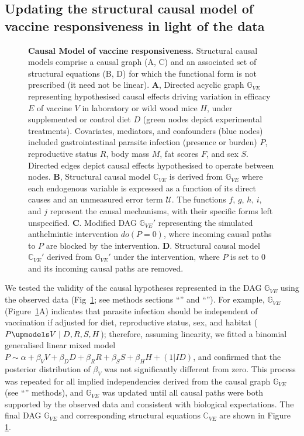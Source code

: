 \documentclass[a4paper, hidelinks, 11pt]{article}
\begin{document}
\subsection{Updating the structural causal model of vaccine responsiveness in light of the data}

\begin{figure}[htbp]
	\centering
	
	\caption{\textbf{Causal Model of vaccine responsiveness.} Structural causal models comprise a causal graph (A, C) and an associated set of structural equations (B, D) for which the functional form is not prescribed (it need not be linear). \textbf{A}, Directed acyclic graph $\mathbb{G}_{VE}$ representing hypothesised causal effects driving variation in efficacy \(E\) of vaccine \(V\) in laboratory or wild wood mice \(H\), under supplemented or control diet \(D\) (green nodes depict experimental treatments). Covariates, mediators, and confounders (blue nodes) included gastrointestinal parasite infection (presence or burden) \(P\), reproductive status \(R\), body mass \(M\), fat scores \(F\), and sex \(S\). Directed edges depict causal effects hypothesised to operate between nodes. \textbf{B}, Structural causal model \(\mathbb{C}_{VE}\) is derived from $\mathbb{G}_{VE}$ where each endogenous variable is expressed as a function of its direct causes and an unmeasured error term $\mathcal{U}$. The functions $f$, $g$, $h$, $i$, and $j$ represent the causal mechanisms, with their specific forms left unspecified. \textbf{C}. Modified DAG $\mathbb{G}_{VE}'$ representing the simulated anthelmintic intervention $do(P=0)$, where incoming causal paths to $P$ are blocked by the intervention. \textbf{D}. Structural causal model $\mathbb{C}_{VE}'$ derived from $\mathbb{G}_{VE}'$ under the intervention, where $P$ is set to 0 and its incoming causal paths are removed.}

	\label{fig:DAGtikz}
\end{figure}

We tested the validity of the causal hypotheses represented in the DAG $\mathbb{G}_{VE}$ using the observed data (Fig~\ref{fig:DAGtikz}; see methods sections ``'' and ``''). For example, $\mathbb{G}_{VE}$ (Figure~\ref{fig:DAGtikz}A) indicates that parasite infection should be independent of vaccination if adjusted for diet, reproductive status, sex, and habitat ($P \upmodels V \mid D, R, S, H$); therefore, assuming linearity, we fitted a binomial generalised linear mixed model $P \sim \alpha + \beta_V V + \beta_D D + \beta_R R + \beta_S S + \beta_H H + (1 | ID)$, and confirmed that the posterior distribution of $\beta_V$ was not significantly different from zero. This process was repeated for all implied independencies derived from the causal graph $\mathbb{G}_{VE}$ (see ``'' methods), and $\mathbb{G}_{VE}$ was updated until all causal paths were both supported by the observed data and consistent with biological expectations. The final DAG $\mathbb{G}_{VE}$ and corresponding structural equations $\mathbb{C}_{VE}$ are shown in Figure \ref{fig:DAGtikz}.
\end{document}
